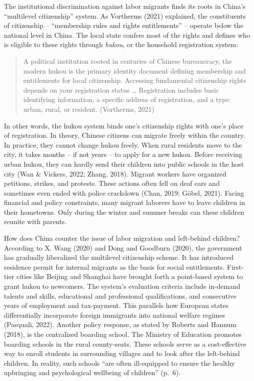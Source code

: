\documentclass[
  man,floatsintext]{apa7}
\begin{document}
The institutional discrimination against labor migrants finds its roots in China's ``multilevel citizenship'' system. As Vortherms (2021) explained, the constituents of citizenship -- ``membership rules and rights entitlements'' -- operate below the national level in China. The local state confers most of the rights and defines who is eligible to these rights through \emph{hukou}, or the household registration system:

\begin{quote}
A political institution rooted in centuries of Chinese bureaucracy, the modern hukou is the primary identity document defining membership and entitlements for local citizenship. Accessing fundamental citizenship rights depends on your registration status \ldots{} Registration includes basic identifying information, a specific address of registration, and a type: urban, rural, or resident. (Vortherms, 2021)
\end{quote}

In other words, the hukou system binds one's citizenship rights with one's place of registration. In theory, Chinese citizens can migrate freely within the country. In practice, they cannot change hukou freely. When rural residents move to the city, it takes months -- if not years -- to apply for a new hukou. Before receiving urban hukou, they can hardly send their children into public schools in the host city (Wan \& Vickers, 2022; Zhang, 2018). Migrant workers have organized petitions, strikes, and protests. These actions often fell on deaf ears and sometimes even ended with police crackdown (Chan, 2019; Göbel, 2021). Facing financial and policy constraints, many migrant laborers have to leave children in their hometowns. Only during the winter and summer breaks can these children reunite with parents.

How does China counter the issue of labor migration and left-behind children? According to X. Wang (2020) and Dong and Goodburn (2020), the government has gradually liberalized the multilevel citizenship scheme. It has introduced residence permit for internal migrants as the basis for social entitlements. First-tier cities like Beijing and Shanghai have brought forth a point-based system to grant hukou to newcomers. The system's evaluation criteria include in-demand talents and skills, educational and professional qualifications, and consecutive years of employment and tax-payment. This parallels how European states differentially incorporate foreign immigrants into national welfare regimes (Pasquali, 2022). Another policy response, as stated by Roberts and Hannum (2018), is the centralized boarding school. The Ministry of Education promotes boarding schools in the rural county-seats. These schools serve as a cost-effective way to enroll students in surrounding villages and to look after the left-behind children. In reality, such schools ``are often ill-equipped to ensure the healthy upbringing and psychological wellbeing of children'' (p.~6).
\end{document}
